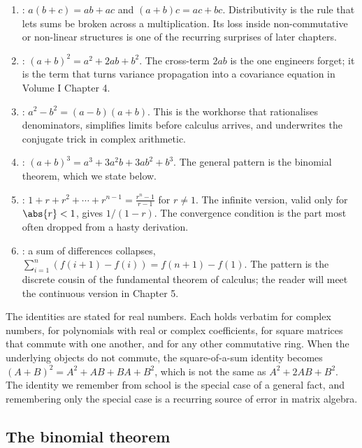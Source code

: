 \begin{enumerate}[leftmargin=*]
  \item {}: $a(b+c) = ab + ac$ and $(a+b)c = ac
    + bc$. Distributivity is the rule that lets sums be broken across
    a multiplication. Its loss inside non-commutative or non-linear
    structures is one of the recurring surprises of later chapters.
  \item {}: $(a+b)^{2} = a^{2} + 2ab + b^{2}$.
    The cross-term $2ab$ is the one engineers forget; it is the term
    that turns variance propagation into a covariance equation in
    Volume I Chapter 4.
  \item {}: $a^{2} - b^{2} = (a-b)(a+b)$.
    This is the workhorse that rationalises denominators, simplifies
    limits before calculus arrives, and underwrites the conjugate
    trick in complex arithmetic.
  \item {}: $(a+b)^{3} = a^{3} + 3a^{2}b + 3ab^{2}
    + b^{3}$. The general pattern is the binomial theorem, which we
    state below.
  \item {}:
    $1 + r + r^{2} + \cdots + r^{n-1} = \frac{r^{n} - 1}{r - 1}$
    for $r \neq 1$. The infinite version, valid only for $\abs{r} <
    1$, gives $1/(1-r)$. The convergence condition is the part most
    often dropped from a hasty derivation.
  \item {}: a sum of differences collapses,
    $\sum_{i=1}^{n} \left(f(i+1) - f(i)\right) = f(n+1) - f(1)$. The
    pattern is the discrete cousin of the fundamental theorem of
    calculus; the reader will meet the continuous version in
    Chapter 5.
\end{enumerate}

The identities are stated for real numbers. Each holds verbatim for
complex numbers, for polynomials with real or complex coefficients,
for square matrices that commute with one another, and for any other
commutative ring. When the underlying objects do not commute, the
square-of-a-sum identity becomes $(A+B)^{2} = A^{2} + AB + BA + B^{2}$,
which is not the same as $A^{2} + 2AB + B^{2}$. The identity we
remember from school is the special case of a general fact, and
remembering only the special case is a recurring source of error in
matrix algebra.

\subsection{The binomial theorem}

